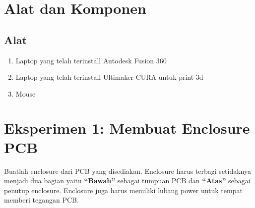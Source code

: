 \section{Alat dan Komponen}
\subsection{Alat}
\begin{enumerate}
    \item Laptop yang telah terinstall Autodesk Fusion 360
    \item Laptop yang telah terinstall Ultimaker CURA untuk print 3d
    \item Mouse
\end{enumerate}

\section{Eksperimen 1: Membuat Enclosure PCB}
Buatlah enclosure dari PCB yang disediakan. Enclosure harus terbagi setidaknya menjadi dua bagian yaitu
\textbf{“Bawah”} sebagai tumpuan PCB dan \textbf{“Atas”} sebagai penutup enclosure. Enclosure juga harus memiliki
lubang power untuk tempat memberi tegangan PCB.
